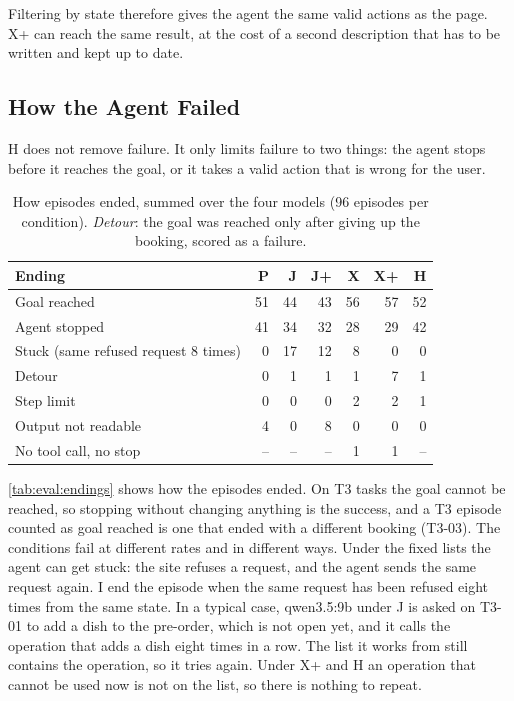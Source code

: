 Filtering by state therefore gives the agent the same valid actions as the page.
X+ can reach the same result, at the cost of a second description that has to be written and kept up to date.

\subsection{How the Agent Failed}\label{sec:disc:endings}

H does not remove failure.
It only limits failure to two things: the agent stops before it reaches the goal, or it takes a valid action that is wrong for the user.

\begin{table}[htbp]
\centering
\caption{How episodes ended, summed over the four models (96 episodes per condition). \emph{Detour}: the goal was reached only after giving up the booking, scored as a failure.}
\label{tab:eval:endings}
\begin{tabular}{lrrrrrr}
\hline
Ending & P & J & J+ & X & X+ & H \\
\hline
Goal reached & 51 & 44 & 43 & 56 & 57 & 52 \\
Agent stopped & 41 & 34 & 32 & 28 & 29 & 42 \\
Stuck (same refused request 8 times) & 0 & 17 & 12 & 8 & 0 & 0 \\
Detour & 0 & 1 & 1 & 1 & 7 & 1 \\
Step limit & 0 & 0 & 0 & 2 & 2 & 1 \\
Output not readable & 4 & 0 & 8 & 0 & 0 & 0 \\
No tool call, no stop & -- & -- & -- & 1 & 1 & -- \\
\hline
\end{tabular}
\end{table}

\autoref{tab:eval:endings} shows how the episodes ended.
On T3 tasks the goal cannot be reached, so stopping without changing anything is the success, and a T3 episode counted as goal reached is one that ended with a different booking (T3-03).
The conditions fail at different rates and in different ways.
Under the fixed lists the agent can get stuck: the site refuses a request, and the agent sends the same request again.
I end the episode when the same request has been refused eight times from the same state.
In a typical case, qwen3.5:9b under J is asked on T3-01 to add a dish to the pre-order, which is not open yet, and it calls the operation that adds a dish eight times in a row.
The list it works from still contains the operation, so it tries again.
Under X+ and H an operation that cannot be used now is not on the list, so there is nothing to repeat.

